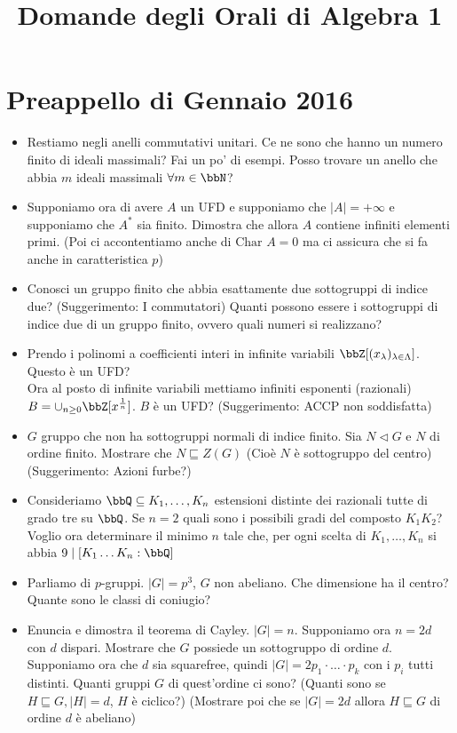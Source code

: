 \documentclass[a4paper,11pt,NoNotes,GeneralMath]{stdmdoc}
\newcommand{\Char}{\text{Char }}
\newcommand{\sgr}{\sqsubseteq}
\newcommand{\nrm}{\lhd}
\begin{document}
	\title{Domande degli Orali di Algebra 1}
	\autodate

    \section*{Preappello di Gennaio 2016}
    \begin{itemize}
        \item Restiamo negli anelli commutativi unitari. Ce ne sono che hanno un numero finito di ideali massimali? Fai un po' di esempi. Posso trovare un anello che abbia $m$ ideali massimali $\forall m \in \bbN$?
        \item Supponiamo ora di avere $A$ un UFD e supponiamo che $\mid A \mid = + \infty$ e supponiamo che $A^{*}$ sia finito. Dimostra che allora $A$ contiene infiniti elementi primi. (Poi ci accontentiamo anche di $\Char A = 0$ ma ci assicura che si fa anche in caratteristica $p$)
        \item Conosci un gruppo finito che abbia esattamente due sottogruppi di indice due? (Suggerimento: I commutatori) Quanti possono essere i sottogruppi di indice due di un gruppo finito, ovvero quali numeri si realizzano?
        \item Prendo i polinomi a coefficienti interi in infinite variabili $\bbZ [(x_\lambda)_{\lambda \in \Lambda}]$. Questo è un UFD? \\
        Ora al posto di infinite variabili mettiamo infiniti esponenti (razionali) $B = \cup_{n \ge 0} \bbZ [ x^{\frac{1}{n}} ]$. $B$ è un UFD? (Suggerimento: ACCP non soddisfatta)
        \item $G$ gruppo che non ha sottogruppi normali di indice finito. Sia $N \nrm G$ e $N$ di ordine finito. Mostrare che $N \sgr Z(G)$ (Cioè $N$ è sottogruppo del centro) (Suggerimento: Azioni furbe?)
        \item Consideriamo $\bbQ \subseteq K_1, \ldots, K_n$ estensioni distinte dei razionali tutte di grado tre su $\bbQ$. Se $n = 2$ quali sono i possibili gradi del composto $K_1K_2$? Voglio ora determinare il minimo $n$ tale che, per ogni scelta di $K_1, \ldots, K_n$ si abbia $9 \mid [K_1 \ldots K_n : \bbQ ]$
        \item Parliamo di $p$-gruppi. $\mid G \mid = p^3$, $G$ non abeliano. Che dimensione ha il centro? Quante sono le classi di coniugio?
        \item Enuncia e dimostra il teorema di Cayley. $\mid G \mid = n$. Supponiamo ora $n = 2d$ con $d$ dispari. Mostrare che $G$ possiede un sottogruppo di ordine $d$. Supponiamo ora che $d$ sia squarefree, quindi $\mid G \mid = 2 p_1 \cdot \ldots \cdot p_k$ con i $p_i$ tutti distinti. Quanti gruppi $G$ di quest'ordine ci sono? (Quanti sono se $H \sgr G, \mid H \mid = d$, $H$ è ciclico?) (Mostrare poi che se $\mid G \mid = 2d$ allora $H \sgr G$ di ordine $d$ è abeliano)

\end{itemize}
\end{document}
